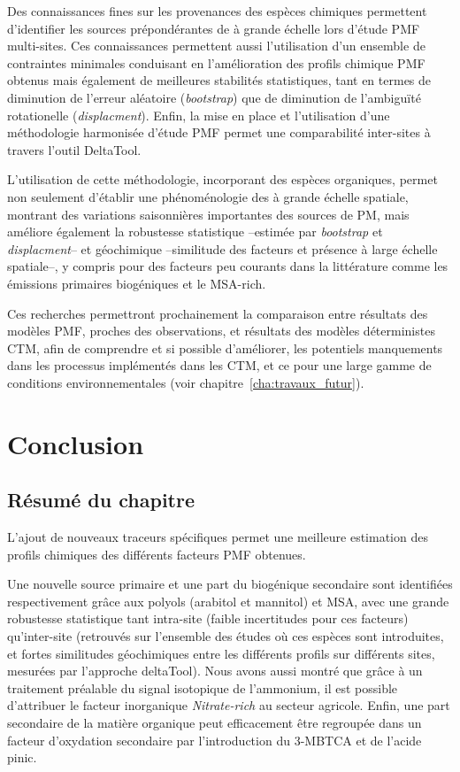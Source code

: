 Des connaissances fines sur les provenances des espèces chimiques permettent d'identifier
les sources prépondérantes de \PMdix{} à grande échelle lors d'étude PMF multi-sites.
Ces connaissances permettent aussi l'utilisation d'un ensemble de contraintes minimales
conduisant en l'amélioration des profils chimique PMF obtenus mais également de meilleures
stabilités statistiques, tant en termes de diminution de l'erreur aléatoire
(\textit{bootstrap}) que de diminution de l'ambiguïté rotationelle
(\textit{displacment}).  Enfin, la mise en place et l'utilisation d'une méthodologie
harmonisée d'étude PMF permet une comparabilité inter-sites à travers l'outil DeltaTool.

L'utilisation de cette méthodologie, incorporant des espèces organiques, permet non
seulement d'établir une phénoménologie des \PMdix{} à grande échelle spatiale, montrant
des variations saisonnières importantes des sources de PM, mais améliore également la
robustesse statistique --estimée par \textit{bootstrap} et \textit{displacment}-- et
géochimique --similitude des facteurs et présence à large échelle spatiale--, y compris
pour des facteurs peu courants dans la littérature comme les émissions primaires
biogéniques et le MSA-rich.

Ces recherches permettront prochainement la comparaison entre résultats des modèles PMF,
proches des observations, et résultats des modèles déterministes CTM, afin de comprendre
et si possible d'améliorer, les potentiels manquements dans les processus implémentés
dans les CTM, et ce pour une large gamme de conditions environnementales (voir
chapitre~\ref{cha:travaux_futur}).

\section{Conclusion}%
\label{sec:conclusion_chap3}

\subsection{Résumé du chapitre}%
\label{sub:résumé_du_chapitre_3}

L'ajout de nouveaux traceurs spécifiques permet une meilleure estimation des profils
chimiques des différents facteurs PMF obtenues. 

Une nouvelle source primaire et une part du biogénique secondaire sont identifiées
respectivement grâce aux polyols (arabitol et mannitol) et MSA, avec une grande
robustesse statistique tant intra-site (faible incertitudes pour ces facteurs)
qu'inter-site (retrouvés sur l'ensemble des études où ces espèces sont introduites, et
fortes similitudes géochimiques entre les différents profils sur différents sites,
mesurées par l'approche deltaTool).  Nous avons aussi montré que grâce à un traitement
préalable du signal isotopique de l'ammonium, il est possible d'attribuer le facteur
inorganique \textit{Nitrate-rich} au secteur agricole.  Enfin, une part secondaire de la
matière organique peut efficacement être regroupée dans un facteur d'oxydation secondaire
par l'introduction du 3-MBTCA et de l'acide pinic.

